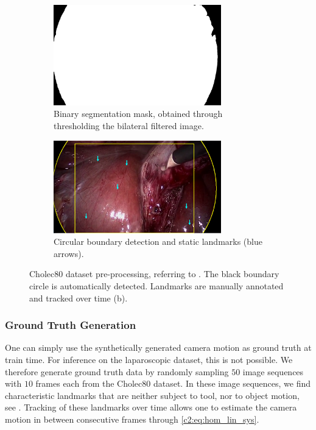 \begin{figure}
\centering
\begin{subfigure}[b]{\textwidth}
    \centering
    \includegraphics[width=0.8\textwidth]{img/annotation/annotation_seg.png}
    \caption{Binary segmentation mask, obtained through thresholding the bilateral filtered image.}
    \label{c2:fig:seg_a}
\end{subfigure}
\begin{subfigure}[b]{\textwidth}
    \centering
    \includegraphics[width=0.8\textwidth]{img/annotation/annotation_real.png}
    \caption{Circular boundary detection and static landmarks (blue arrows).}
    \label{c2:fig:seg_b}
\end{subfigure}
\caption{Cholec80 dataset pre-processing, referring to . The black boundary circle is automatically detected. Landmarks are manually annotated and tracked over time (b).}
\label{c2:fig:seg}
\end{figure}

\subsubsection{Ground Truth Generation}
\label{c2:sec:gt_gen}
One can simply use the synthetically generated camera motion as ground truth at train time. For inference on the laparoscopic dataset, this is not possible. We therefore generate ground truth data by randomly sampling $50$ image sequences with $10$ frames each from the Cholec80 dataset. In these image sequences, we find characteristic landmarks that are neither subject to tool, nor to object motion, see . Tracking of these landmarks over time allows one to estimate the camera motion in between consecutive frames through \eqref{c2:eq:hom_lin_sys}.

